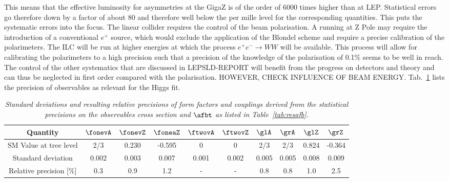 This means that the effective luminosity for asymmetries at the GigaZ is of the order of 6000 times higher than at LEP. Statistical errors go therefore down by a factor of about 80 and therefore well below the per mille level for the corresponding quantities. This puts the systematic errors into the focus. The linear collider requires the control of the beam polarisation. A running at Z Pole may require the introduction of a conventional $e^+$ source, which would exclude the application of the Blondel scheme and require a precise calibration of the polarimeters. The ILC will be run at higher energies at which the process $e^+e^- \rightarrow WW$ will be available. This process will allow for calibrating the polarimeters to a high precision such that a precision of the knowledge of the polarisation of 0.1\% seems to be well in reach. The control of the other systematics that are discussed in LEPSLD-REPORT will benefit from the progress on detectors and theory and can thus be neglected in first order compared with the polarisation. HOWEVER, CHECK INFLUENCE OF BEAM ENERGY. Tab.~\ref{tab:gigazresults} lists the precision of observables as relevant for the Higgs fit. 

\begin{table*}[tb]
\begin{footnotesize}
  \begin{center}
    \begin{tabular}{|c|c|c|c|c|c|c|c|c|c|}
      \hline
      Quantity & $\fonevA$ & $\fonevZ$  & $ \foneaZ$  & $\ftwovA$ & $\ftwovZ$ & $\glA$ &   $\grA$ & $\glZ$  & $\grZ$ \\ 
      \hline
      \hline
       SM Value at tree level & 2/3 &  0.230 & -0.595 & 0 & 0 & 2/3 & 2/3  & 0.824 & -0.364 \\ 
      \hline
       Standard deviation      & 0.002 &  0.003 & 0.007 & 0.001 & 0.002  & 0.005 & 0.005 & 0.008 & 0.009 \\ 
      \hline
      Relative precision [\%] & 0.3 &  0.9 & 1.2  & - & - & 0.8 & 0.8 & 1.0 & 2.5 \\ 
      \hline
    \end{tabular}
  \end{center}
  \caption{\sl Standard deviations and resulting relative precisions of form factors and couplings derived from the statistical precisions on the observables cross section and $\afbt$ as listed in Table~\ref{tab:resafb}.}
  \label{tab:gigazresults}
\end{footnotesize}
\end{table*}

